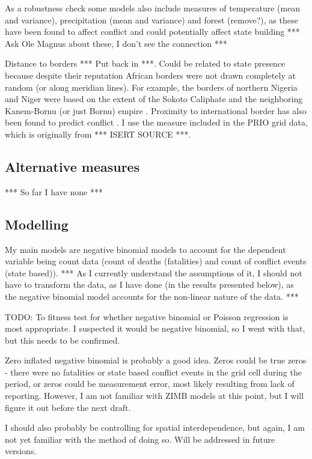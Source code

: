 \documentclass[12pt]{article}
\begin{document}
\begin{multicols}{2}
As a robustness check some models also include measures of temperature (mean and
variance), precipitation (mean and variance) and forest (remove?), as these have
been found to affect conflict and could potentially affect state building ***
Ask Ole Magnus about these, I don't see the connection ***

Distance to borders *** Put back in ***. Could be related to state presence
because despite their reputation African borders were not drawn completely at
random (or along meridian lines). For example, the borders of northern Nigeria
and Niger were based on the extent of the Sokoto Caliphate and the neighboring
Kanem-Bornu (or just Bornu) empire \citep{HiribarrenVincent2017AHoB}. Proximity
to international border has also been found to predict conflict
\citep{Buhaug2002}. I use the measure included in the PRIO grid data, which is
originally from *** ISERT SOURCE ***.

\subsection{Alternative measures}

*** So far I have none ***

\subsection{Modelling}

My main models are negative binomial models to account for the dependent
variable being count data (count of deaths (fatalities) and count of conflict
events (state based)). *** As I currently understand the assumptions of it, I
should not have to transform the data, as I have done (in the results presented
below), as the negative binomial model accounts for the non-linear nature of the
data. ***

TODO: To fitness test for whether negative binomial or Poisson regression is
most appropriate. I suspected it would be negative binomial, so I went with
that, but this needs to be confirmed.

Zero inflated negative binomial is probably a good idea. Zeros could be true
zeros - there were no fatalities or state based conflict events in the grid cell
during the period, or zeros could be measurement error, most likely resulting
from lack of reporting. However, I am not familiar with ZIMB models at this
point, but I will figure it out before the next draft.

I should also probably be controlling for spatial interdependence, but again, I
am not yet familiar with the method of doing so. Will be addressed in future
versions.


\end{multicols}
\end{document}
